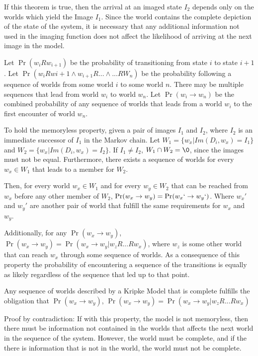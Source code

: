If this theorem is true, then the arrival at an imaged state $I_2$ depends only on the worlds which yield the Image $I_1$. Since the world contains the complete depiction of the state of the system, it is necessary that any additional information not used in the imaging function does not affect the likelihood of arriving at the next image in the model.

Let $\Pr(w_{i}Rw_{i+1})$ be the probability of transitioning from state $i$ to state $i+1$. Let $\Pr(w_{i}Rw{i+1} \wedge w_{i+1}R... \wedge ...RW_{n})$ be the probability following a sequence of worlds from some world $i$ to some world $n$. There may be multiple sequences that lead from world $w_i$ to world $w_n$. Let $\Pr(w_i \rightarrow w_n)$ be the combined probability of any sequence of worlds that leads from a world $w_i$ to the first encounter of world $w_n$.

To hold the memoryless property, given a pair of images $I_1$ and $I_2$, where $I_2$ is an immediate successor of $I_1$ in the Markov chain. Let $W_1 = \{ w_x | Im(D_i, w_x) = I_1 \}$ and $W_2 = \{ w_x | Im(D_i, w_x) = I_2 \}$. If $I_1 \neq I_2$, $W_1 \cap W_2 = \0$, since the images must not be equal. Furthermore, there exists a sequence of worlds for every $w_x \in W_1$ that leads to a member for $W_2$.

Then, for every world $w_x \in W_1$ and for every $w_y \in W_2$ that can be reached from $w_x$ before any other member of $W_2$, $\Pr(w_x \rightarrow w_y) = \Pr(w_x` \rightarrow w_y`)$. Where $w_x'$ and $w_y'$ are another pair of world that fulfill the same requirements for $w_x$ and $w_y$.

Additionally, for any $\Pr(w_x \rightarrow w_y)$, $\Pr(w_x \rightarrow w_y) = \Pr(w_x \rightarrow w_y | w_{z}R...Rw_{x})$, where $w_z$ is some other world that can reach $w_x$ through some sequence of worlds. As a consequence of this property the probability of encountering a sequence of the transitions is equally as likely regardless of the sequence that led up to that point.

\begin{cor}
Any sequence of worlds described by a Kripke Model that is complete fulfills the obligation that $\Pr(w_x \rightarrow w_y)$, $\Pr(w_x \rightarrow w_y) = \Pr(w_x \rightarrow w_y | w_{z}R...Rw_{x})$
\end{cor}

Proof by contradiction: If with this property, the model is not memoryless, then there must be information not contained in the worlds that affects the next world in the sequence of the system. However, the world must be complete, and if the there is information that is not in the world, the world must not be complete.

